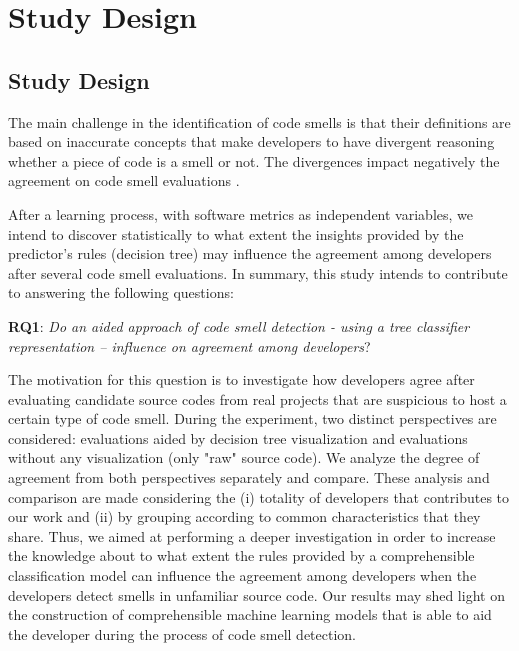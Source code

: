 \chapter{Study Design}


\section{Study Design}
\label{sec:studydesign}

The main challenge in the identification of code smells is that their definitions are based on inaccurate concepts that make developers to have divergent reasoning whether a piece of code is a smell or not. The divergences impact negatively the agreement on code smell evaluations \cite{hozano2018you}.

After a learning process, with software metrics as independent variables,  we intend to discover statistically to what extent the insights provided by the predictor's rules (decision tree) may influence the agreement among developers after several code smell evaluations. In summary, this study intends to contribute to answering the following questions:

\textbf{RQ1}: \textit{Do an aided approach of code smell detection - using a tree classifier representation – influence on agreement among developers}?

The motivation for this question is to investigate how developers agree after evaluating candidate source codes from real projects that are suspicious to host a certain type of code smell. During the experiment, two distinct perspectives are considered: evaluations aided by decision tree visualization and evaluations without any visualization (only "raw" source code). We analyze the degree of agreement from both perspectives separately and compare.
These analysis and comparison are made considering the (i) totality of developers that contributes to our work and (ii) by grouping according to common characteristics that they share. Thus, we aimed at performing a deeper investigation in order to increase the knowledge about to what extent the rules provided by a comprehensible classification model can influence the agreement among developers when the developers detect smells in unfamiliar source code. Our results may shed light on the construction of comprehensible machine learning models that is able to aid the developer during the process of code smell detection.


